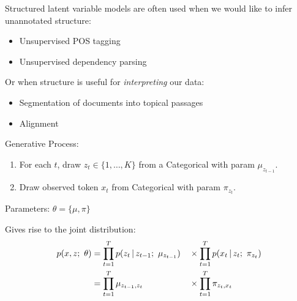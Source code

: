 \begin{frame}
\begin{center}
\end{center}


Structured latent variable models are often used when we would like to infer unannotated structure:

\begin{itemize}
    \item Unsupervised POS tagging~\citep{brown1992class,merialdo1994tagging,smith2005contrastive}
    \item Unsupervised dependency parsing~\citep{klein2004corpus,headden2009improving}
\end{itemize}


Or when structure is useful for \textit{interpreting} our data:
\begin{itemize}
    \item Segmentation of documents into topical passages~\citep{hearst1997texttiling}
    \item Alignment~\citep{vogel1996hmm}
\end{itemize}
\end{frame}

\begin{frame}
Generative Process:

\begin{enumerate}
    \item For each $t$, draw $z_t \in \{1, \ldots, K\}$ from a Categorical with param $\mu_{z_{t-1}}$.
    \item Draw observed token $x_t$ from Categorical with param $\pi_{z_{t}}$.
\end{enumerate}
\air
Parameters: $\theta = \{ \mu, \pi\}$
\air

\pause
Gives rise to the joint distribution:
\begin{alignat*}{2}
    p(x, z; \ \theta)  &= \prod_{t=1}^T p(z_t \given z_{t-1} ; \ \mu_{z_{t-1}}) &&\times \prod_{t=1}^T p(x_t \given z_{t} ; \ \pi_{z_{t}}) \nonumber \\ 
    &= \prod_{t=1}^T \mu_{z_{t-1}, z_t} &&\times \prod_{t=1}^T \pi_{z_{t}, x_t}
\end{alignat*}

\end{frame}


